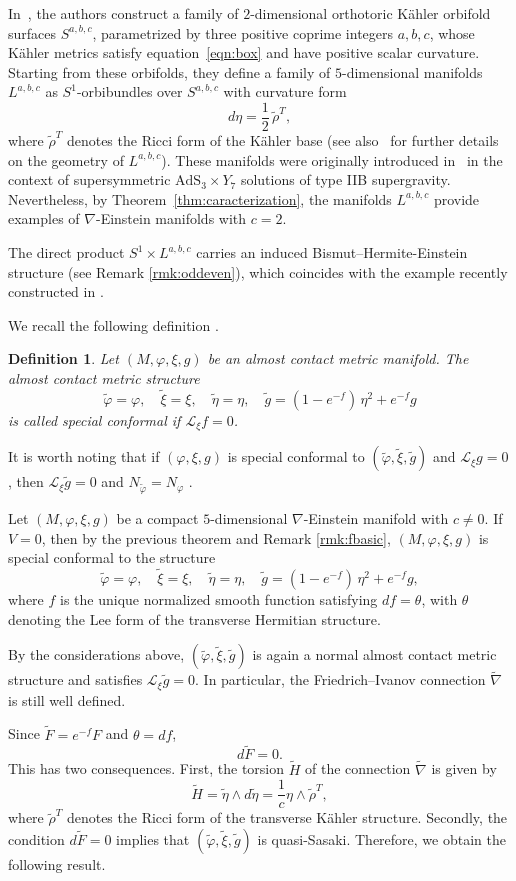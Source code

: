 \documentclass{article}
\newtheorem{defn}[thm]{Definition}
\theoremstyle{definition}
\renewcommand{\phi}{\varphi}
\numberwithin{equation}{section}
\begin{document}
In~\cite[Section~4.2]{CGMS}, the authors construct a family of $2$-dimensional orthotoric K\"ahler orbifold surfaces $S^{a,b,c}$, parametrized by three positive coprime integers $a,b,c$, whose K\"ahler metrics satisfy equation~\eqref{eqn:box} and have positive scalar curvature. Starting from these orbifolds, they define a family of $5$-dimensional manifolds $L^{a,b,c}$ as $S^1$-orbibundles over $S^{a,b,c}$ with curvature form
\[
d\eta = \frac{1}{2}\,\tilde{\rho}^T,
\]
where $\tilde{\rho}^T$ denotes the Ricci form of the K\"ahler base (see also~\cite{ALL} for further details on the geometry of $L^{a,b,c}$). These manifolds were originally introduced in~\cite{CGMS} in the context of supersymmetric $\mathrm{AdS}_3 \times Y_7$ solutions of type IIB supergravity. Nevertheless, by Theorem~\ref{thm:caracterization}, the manifolds $L^{a,b,c}$ provide examples of $\nabla$-Einstein manifolds with $c = 2$. \par
The direct product $S^1 \times L^{a,b,c}$ carries an induced Bismut--Hermite-Einstein structure (see Remark \ref{rmk:oddeven}), which coincides with the example recently constructed in \cite{ALL}.
\medskip

We recall the following definition \cite{FI2}.

\begin{defn}
Let $(M,\phi,\xi,g)$ be an almost contact metric manifold. The almost contact metric structure
\[
\tilde \phi = \phi, \quad 
\tilde \xi = \xi, \quad 
\tilde \eta = \eta, \quad 
\tilde g = (1-e^{-f})\,\eta^2 + e^{-f} g
\]
is called \emph{special conformal} if $\mathcal{L}_\xi f = 0$.
\end{defn}

It is worth noting that if $(\phi,\xi,g)$ is special conformal to $(\tilde \phi,\tilde \xi,\tilde g)$ and $\mathcal{L}_\xi g = 0$, then $\mathcal{L}_\xi \tilde g = 0$ and $N_{\tilde \phi} = N_\phi$ \cite{FI2}.

\medskip
Let $(M,\phi,\xi,g)$ be a compact $5$-dimensional $\nabla$-Einstein manifold with $c \neq 0$. If $V = 0$, then by the previous theorem and Remark \ref{rmk:fbasic}, $(M,\phi,\xi,g)$ is special conformal to the structure
\[
\tilde \phi = \phi, \quad 
\tilde \xi = \xi, \quad 
\tilde \eta = \eta, \quad 
\tilde g = (1-e^{-f})\,\eta^2 + e^{-f} g,
\]
where $f$ is the unique normalized smooth function satisfying $df = \theta$, with $\theta$ denoting the Lee form of the transverse Hermitian structure. 

By the considerations above, $(\tilde \phi,\tilde \xi,\tilde g)$ is again a normal almost contact metric structure and satisfies $\mathcal{L}_\xi \tilde g = 0$. In particular, the Friedrich--Ivanov connection $\tilde \nabla$ is still well defined. \par
Since $\tilde F = e^{-f} F$ and $\theta = df$, 
\[
d\tilde F = 0.
\]
This has two consequences. First, the torsion $\tilde H$ of the connection $\tilde \nabla$ is given by
\[
\tilde H = \tilde \eta \wedge d\tilde \eta = \frac{1}{c} \eta \wedge \tilde \rho^T,
\]
where $\tilde \rho^T$ denotes the Ricci form of the transverse K\"ahler structure. Secondly, the condition $d\tilde F = 0$ implies that $(\tilde \phi,\tilde \xi,\tilde g)$ is quasi-Sasaki. Therefore, we obtain the following result.
\end{document}

